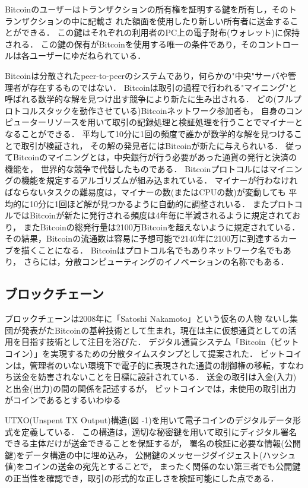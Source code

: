 \documentclass[a4paper,12pt]{jsarticle}
\begin{document}
Bitcoinのユーザーはトランザクションの所有権を証明する鍵を所有し，そのトランザクションの中に記載さ
れた額面を使用したり新しい所有者に送金することができる．
この鍵はそれぞれの利用者のPC上の電子財布(ウォレット)に保持される．
この鍵の保有がBitcoinを使用する唯一の条件であり，そのコントロールは各ユーザーにゆだねられている．

Bitcoinは分散されたpeer-to-peerのシステムであり，何らかの"中央"サーバや管理者が存在するものではない．
Bitcoinは取引の過程で行われる"マイニング"と呼ばれる数学的な解を見つけ出す競争により新たに生み出される．
どの(フルプロトコルスタックを動作させている)Bitcoinネットワーク参加者も，
自身のコンピューターリソースを用いて取引の記録処理と検証処理を行うことでマイナーとなることができる．
平均して10分に1回の頻度で誰かが数学的な解を見つけることで取引が検証され，
その解の発見者にはBitcoinが新たに与えられいる．
従ってBitcoinのマイニングとは，中央銀行が行う必要があった通貨の発行と決済の機能を，
世界的な競争で代替したものである．
Bitcoinプロトコルにはマイニングの機能を規定するアルゴリズムが組み込まれている．
マイナーが行わなければならないタスクの難易度は，マイナーの数(またはCPUの数)が変動しても
平均的に10分に1回ほど解が見つかるように自動的に調整されいる．
またプロトコルではBitcoinが新たに発行される頻度は4年毎に半減されるように規定されており，
またBitcoinの総発行量は2100万Bitcoinを超えないように規定されている．
その結果，Bitcoinの流通数は容易に予想可能で2140年に2100万に到達するカーブを描くことになる．
Bitcoinはプロトコル名でもありネットワーク名でもあり，
さらには，分散コンピューティングのイノベーションの名称でもある．

\subsection{ブロックチェーン}

ブロックチェーンは2008年に「Satoshi Nakamoto」という仮名の人物
ないし集団が発表がたBitcoinの基幹技術として生まれ，現在は主に仮想通貨としての活用を目指す技術として注目を浴びた．
デジタル通貨システム「Bitcoin（ビットコイン）」を実現するための分散タイムスタンプとして提案された．
ビットコインは，管理者のいない環境下で電子的に表現された通貨の制御権の移転，すなわち送金を妨害されないことを目標に設計されている．
送金の取引は入金(入力)と出金(出力)の間の関係を記述するが，
ビットコインでは，未使用の取引出力がコインであるとするいわゆる

UTXO(Unspent TX Output)構造(図 -1)を用いて電子コインのデジタルデータ形式を定義している．
この構造は，適切な秘密鍵を用いて取引にディジタル署名できる主体だけが送金できることを保証するが，
署名の検証に必要な情報(公開鍵)をデータ構造の中に埋め込み，
公開鍵のメッセージダイジェスト(ハッシュ値)をコインの送金の宛先とすることで，
まったく関係のない第三者でも公開鍵の正当性を確認でき，取引の形式的な正しさを検証可能にした点である．
\end{document}
